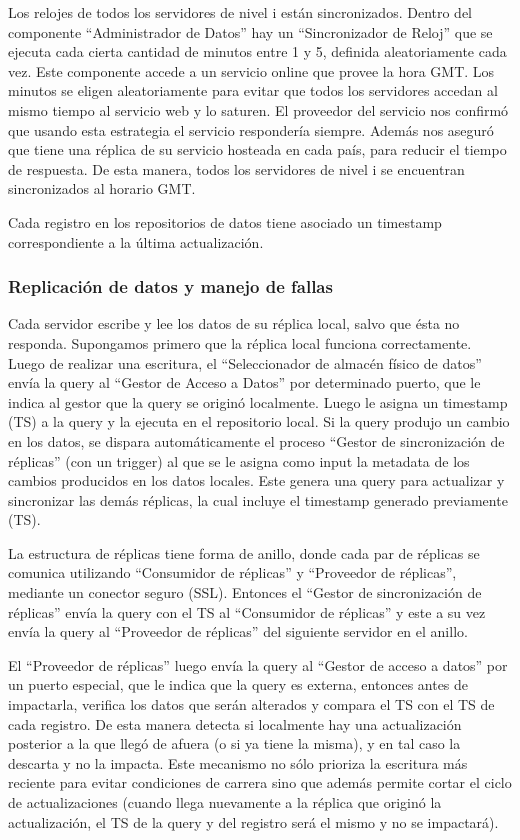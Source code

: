 Los relojes de todos los servidores de nivel i están sincronizados.
Dentro del componente ``Administrador de Datos'' hay un ``Sincronizador de Reloj'' que se ejecuta cada cierta cantidad de minutos entre 1 y 5, definida aleatoriamente cada vez. Este componente accede a un servicio online que provee la hora GMT. Los minutos se eligen aleatoriamente para evitar que todos los servidores accedan al mismo tiempo al servicio web y lo saturen. El proveedor del servicio nos confirmó que usando esta  estrategia el servicio respondería siempre. Además nos aseguró que tiene una réplica de su servicio hosteada en cada país, para reducir el tiempo de respuesta. De esta manera, todos los servidores de nivel i se encuentran sincronizados al horario GMT.

Cada registro en los repositorios de datos tiene asociado un timestamp correspondiente a la última actualización.

\subsubsection{Replicación de datos y manejo de fallas}

Cada servidor escribe y lee los datos de su réplica local, salvo que ésta no responda. Supongamos primero que la réplica local funciona correctamente. Luego de realizar una escritura, el “Seleccionador de almacén físico de datos” envía la query al “Gestor de Acceso a Datos” por determinado puerto, que le indica al gestor que la query se originó localmente. Luego le asigna un timestamp (TS) a la query y la ejecuta en el repositorio local. Si la query produjo un cambio en los datos, se dispara automáticamente el proceso “Gestor de sincronización de réplicas” (con un trigger) al que se le asigna como input la metadata de los cambios producidos en los datos locales. Este genera una query para actualizar y sincronizar las demás réplicas, la cual incluye el timestamp generado previamente (TS).

La estructura de réplicas tiene forma de anillo, donde cada par de réplicas se comunica utilizando “Consumidor de réplicas” y “Proveedor de réplicas”, mediante un conector seguro (SSL). Entonces el “Gestor de sincronización de réplicas” envía la query con el TS al “Consumidor de réplicas” y este a su vez envía la query al “Proveedor de réplicas” del siguiente servidor en el anillo.

El “Proveedor de réplicas” luego envía la query al “Gestor de acceso a datos” por un puerto especial, que le indica que la query es externa, entonces antes de impactarla, verifica los datos que serán alterados y compara el TS con el TS de cada registro. De esta manera detecta si localmente hay una actualización posterior a la que llegó de afuera (o si ya tiene la misma), y en tal caso la descarta y no la impacta. Este mecanismo no sólo prioriza la escritura más reciente para evitar condiciones de carrera sino que además permite cortar el ciclo de actualizaciones (cuando llega nuevamente a la réplica que originó la actualización, el TS de la query y del registro será el mismo y no se impactará).

